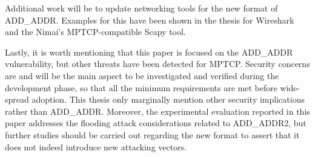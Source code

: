 Additional work will be to update networking tools for the new format of ADD\_ADDR. Examples for this have been shown in the thesis for Wireshark and the Nimai's MPTCP-compatible Scapy tool.

Lastly, it is worth mentioning that this paper is focused on the ADD\_ADDR vulnerability, but other threats have been detected for MPTCP. Security concerns are and will be the main aspect to be investigated and verified during the development phase, so that all the minimum requirements are met before wide-spread adoption. This thesis only marginally mention other security implications rather than ADD\_ADDR. Moreover, the experimental evaluation reported in this paper addresses the flooding attack considerations related to ADD\_ADDR2, but further studies should be carried out regarding the new format to assert that it does not indeed introduce new attacking vectors.
